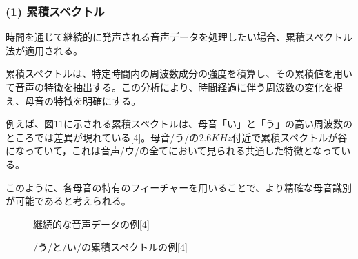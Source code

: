 \documentclass{article}
\begin{document}
\subsubsection*{(1) 累積スペクトル}
\begin{spacing}{1.2}
    時間を通じて継続的に発声される音声データを処理したい場合、累積スペクトル法が適用される。
    
    累積スペクトルは、特定時間内の周波数成分の強度を積算し、その累積値を用いて音声の特徴を抽出する。この分析により、時間経過に伴う周波数の変化を捉え、母音の特徴を明確にする。
    
    例えば、図11に示される累積スペクトルは、母音「い」と「う」の高い周波数のところでは差異が現れている[4]。母音/う/の$2.6KHz$付近で累積スペクトルが谷になっていて，これは音声/ウ/の全てにおいて見られる共通した特徴となっている。
    
    このように、各母音の特有のフィーチャーを用いることで、より精確な母音識別が可能であると考えられる。
\end{spacing}
\begin{figure}[htbp]
    \centering
    \begin{minipage}[b]{0.5\textwidth} %
      \centering
      \caption{継続的な音声データの例[4]}
    \end{minipage}%
    \begin{minipage}[b]{0.5\textwidth}
      \centering
      \caption{/う/と/い/の累積スペクトルの例[4]} 
    \end{minipage}
\end{figure}
\FloatBarrier
\end{document}
